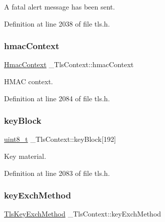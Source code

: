 A fatal alert message has been sent. 



Definition at line 2038 of file tls.\+h.

\mbox{\label{struct__TlsContext_a97666a3046fedaadf9003020df330ab0}} 
\subsubsection{\texorpdfstring{hmac\+Context}{hmacContext}}
{\footnotesize\ttfamily \hyperlink{structHmacContext}{Hmac\+Context} \+\_\+\+Tls\+Context\+::hmac\+Context}



H\+M\+AC context. 



Definition at line 2084 of file tls.\+h.

\mbox{\label{struct__TlsContext_a3250ccb2f2a63cbc0948d042575571d0}} 
\subsubsection{\texorpdfstring{key\+Block}{keyBlock}}
{\footnotesize\ttfamily \hyperlink{stdint_8h_aba7bc1797add20fe3efdf37ced1182c5}{uint8\+\_\+t} \+\_\+\+Tls\+Context\+::key\+Block\mbox{[}192\mbox{]}}



Key material. 



Definition at line 2083 of file tls.\+h.

\mbox{\label{struct__TlsContext_abbb6fdffcc7e15135e682980ef85479b}} 
\subsubsection{\texorpdfstring{key\+Exch\+Method}{keyExchMethod}}
{\footnotesize\ttfamily \hyperlink{tls_8h_a10c9078f6485419c2b8644b573ef0b75}{Tls\+Key\+Exch\+Method} \+\_\+\+Tls\+Context\+::key\+Exch\+Method}



